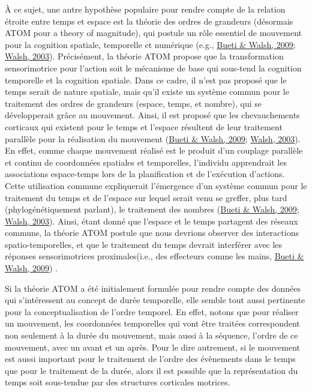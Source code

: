 \documentclass[
  a4paper,12pt,twoside,onecolumn,openright,final,oldfontcommands]{memoir}
\begin{document}
À ce sujet, une autre hypothèse populaire pour rendre compte de la relation étroite entre temps et espace est la théorie des ordres de grandeurs (désormais ATOM pour a theory of magnitude), qui postule un rôle essentiel de mouvement pour la cognition spatiale, temporelle et numérique (e.g., \protect\hyperlink{ref-bueti_parietal_2009}{Bueti \& Walsh, 2009}; \protect\hyperlink{ref-walsh_theory_2003}{Walsh, 2003}). Précisément, la théorie ATOM propose que la transformation sensorimotrice pour l'action soit le mécanisme de base qui sous-tend la cognition temporelle et la cognition spatiale. Dans ce cadre, il n'est pas proposé que le temps serait de nature spatiale, mais qu'il existe un système commun pour le traitement des ordres de grandeurs (espace, temps, et nombre), qui se développerait grâce au mouvement. Ainsi, il est proposé que les chevauchements corticaux qui existent pour le temps et l'espace résultent de leur traitement parallèle pour la réalisation du mouvement (\protect\hyperlink{ref-bueti_parietal_2009}{Bueti \& Walsh, 2009}; \protect\hyperlink{ref-walsh_theory_2003}{Walsh, 2003}). En effet, comme chaque mouvement réalisé est le produit d'un couplage parallèle et continu de coordonnées spatiales et temporelles, l'individu apprendrait les associations espace-temps lors de la planification et de l'exécution d'actions. Cette utilisation commune expliquerait l'émergence d'un système commun pour le traitement du temps et de l'espace sur lequel serait venu se greffer, plus tard (phylogénétiquement parlant), le traitement des nombres (\protect\hyperlink{ref-bueti_parietal_2009}{Bueti \& Walsh, 2009}; \protect\hyperlink{ref-walsh_theory_2003}{Walsh, 2003}). Ainsi, étant donné que l'espace et le temps partagent des réseaux communs, la théorie ATOM postule que nous devrions observer des interactions spatio-temporelles, et que le traitement du temps devrait interférer avec les réponses sensorimotrices proximales(i.e., des effecteurs comme les mains, \protect\hyperlink{ref-bueti_parietal_2009}{Bueti \& Walsh, 2009}) .

Si la théorie ATOM a été initialement formulée pour rendre compte des données qui s'intéressent au concept de durée temporelle, elle semble tout aussi pertinente pour la conceptualisation de l'ordre temporel. En effet, notons que pour réaliser un mouvement, les coordonnées temporelles qui vont être traitées correspondent non seulement à la durée du mouvement, mais aussi à la séquence, l'ordre de ce mouvement, avec un avant et un après. Pour le dire autrement, si le mouvement est aussi important pour le traitement de l'ordre des évènements dans le temps que pour le traitement de la durée, alors il est possible que la représentation du temps soit sous-tendue par des structures corticales motrices.
\end{document}
